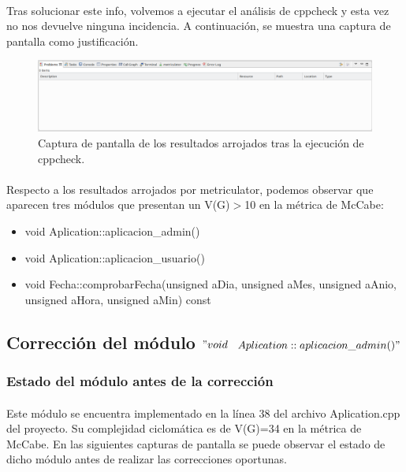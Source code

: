  		\paragraph{}Tras solucionar este info, volvemos a ejecutar el análisis de cppcheck y esta vez no nos devuelve ninguna incidencia. A continuación, se muestra una captura de pantalla como justificación.
 		
 		\begin{figure}[H]
 			\centering
 			\includegraphics[scale=0.32]{img/captura96.png}
 			\caption{Captura de pantalla de los resultados arrojados tras la ejecución de cppcheck.}
 			\label{captura96}
 		\end{figure}
 	
 		\paragraph{}Respecto a los resultados arrojados por metriculator, podemos observar que aparecen tres módulos que presentan un V(G)$>$10 en la métrica de McCabe:
 		
 		\begin{itemize}
 			\item void Aplication::aplicacion\_admin()
 			\item void Aplication::aplicacion\_usuario()
 			\item void Fecha::comprobarFecha(unsigned aDia, unsigned aMes, unsigned aAnio, unsigned aHora, unsigned aMin) const
 		\end{itemize}
 		
 		
 	\subsection{Corrección del módulo $"void$ $Aplication::aplicacion\_admin()"$}
 	
 		\subsubsection{Estado del módulo antes de la corrección}
 		
 		\paragraph{}Este módulo se encuentra implementado en la línea 38 del archivo Aplication.cpp del proyecto. Su complejidad ciclomática es de V(G)=34 en la métrica de McCabe. En las siguientes capturas de pantalla se puede observar el estado de dicho módulo antes de realizar las correcciones oportunas.
 		
